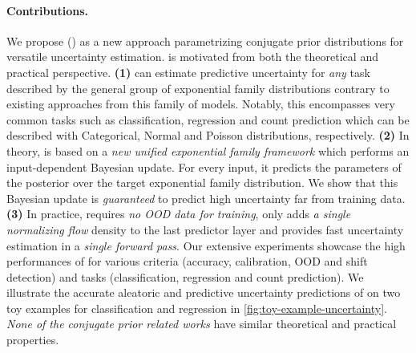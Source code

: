 \paragraph{Contributions.} We propose \NatPN{} (\NatPNacro{}) as a new approach parametrizing conjugate prior distributions for versatile uncertainty estimation. \NatPNacro{}{} is motivated from both the theoretical and practical perspective. 
\textbf{(1)} \NatPNacro{} can estimate predictive uncertainty for \emph{any} task described by the general group of exponential family distributions contrary to existing approaches from this family of models. Notably, this encompasses very common tasks such as classification, regression and count prediction which can be described with Categorical, Normal and Poisson distributions, respectively. 
\textbf{(2)} In theory, \NatPNacro{} is based on a \emph{new unified exponential family framework} which performs an input-dependent Bayesian update. For every input, it predicts the parameters of the posterior over the target exponential family distribution. We show that this Bayesian update is \emph{guaranteed} to predict high uncertainty far from training data.
\textbf{(3)} In practice, \NatPNacro{} requires \emph{no OOD data for training}, only adds \emph{a single normalizing flow} density to the last predictor layer and provides fast uncertainty estimation in a \emph{single forward pass}. Our extensive experiments showcase the high performances of \NatPNacro{} for various criteria (accuracy, calibration, OOD and shift detection) and tasks (classification, regression and count prediction). We illustrate the accurate aleatoric and predictive uncertainty predictions of \NatPNacro{} on two toy examples for classification and regression in \cref{fig:toy-example-uncertainty}. \emph{None of the conjugate prior related works} have similar theoretical and practical properties.

